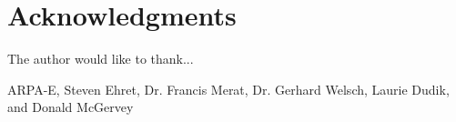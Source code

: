 \section*{Acknowledgments}

The author would like to thank...

ARPA-E,
Steven Ehret,
Dr. Francis Merat,
Dr. Gerhard Welsch,
Laurie Dudik,
and Donald McGervey

